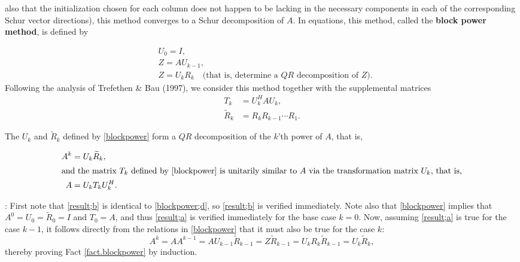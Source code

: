 also that the initialization chosen
for each column does not happen to be lacking in the necessary components in each of the corresponding Schur vector
directions),
this method converges to a Schur decomposition of $A$.  In equations, this method,
called the {\bf block power method}, is defined by
\begin{subeqnA}
\label{blockpower}
\begin{align}
& {U}_{0}=I, \label{blockpower;a}\\
& Z=A{U}_{k-1}, \label{blockpower;b}\\
& Z={U}_{k} {R}_{k} \quad \textrm{(that is, determine a $QR$ decomposition of $Z$)}.\label{blockpower;c}
\end{align}
Following the analysis of Trefethen \& Bau (1997), we consider this method together with the supplemental matrices
\begin{align}
T_{k}&={U}_{k}^H A {U}_{k},\label{blockpower;d}\\
{\widetilde R}_{k}&=R_{k} R_{k-1} \cdots R_{1}.  \label{blockpower;e}
\end{align}
\end{subeqnA}

\begin{fact} \label{fact.blockpower}
The ${U}_{k}$ and ${\widetilde R}_{k}$ defined by \eqref{blockpower}
form a $QR$ decomposition of the $k$'th power of $A$, that is,
\begin{subeqnA}
\label{result}
\begin{align}
A^k &= {U}_{k} {\widetilde R}_{k}, \label{result;a} \\
\intertext{and the matrix $T_{k}$ defined by \eqref{blockpower} is
unitarily similar to $A$ via the transformation matrix ${U}_{k}$, that is,}
A &= {U}_{k} T_{k} {U}_{k}^H. \label{result;b}
\end{align}
\end{subeqnA}
\end{fact}
\enlargethispage{3pt}

\/: 
First note that \eqref{result;b} is identical to \eqref{blockpower;d}, so \eqref{result;b} is verified immediately.  Note also
that \eqref{blockpower} implies that $A^0={U}_{0}={\widetilde R}_{0}=I$ and $T_{0}=A$, and thus \eqref{result;a}
is verified immediately for the base case $k=0$.  Now, assuming \eqref{result;a} is true for the case $k-1$,
it follows directly from the relations in \eqref{blockpower} that it must also be true for the case $k$:
\begin{equation*}
   A^k = A A^{k-1} = A {U}_{k-1} {\widetilde R}_{k-1} = Z {\widetilde R}_{k-1}
   = {U}_{k} {R}_{k} {\widetilde R}_{k-1} = {U}_{k} {\widetilde R}_{k},
\end{equation*}
thereby proving Fact \ref{fact.blockpower} by induction. \endproof

